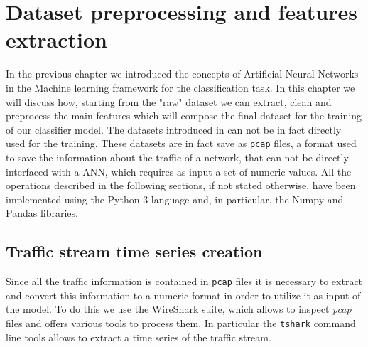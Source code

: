 \chapter{Dataset preprocessing and features extraction}\label{chap4}

In the previous chapter we introduced the concepts of Artificial Neural Networks in the Machine learning framework for the classification task. In this chapter we will discuss how, starting from the "raw" dataset we can extract, clean and preprocess the main features which will compose the final dataset for the training of our classifier model.
The datasets introduced in  can not be in fact directly used for the training. These datasets are in fact save as \texttt{pcap} files, a format used to save the information about the traffic of a network, that can not be directly interfaced with a ANN, which requires as input a set of numeric values. 
All the operations described in the following sections, if not stated otherwise, have been implemented using the Python 3 language\cite{python} and, in particular, the Numpy and Pandas libraries\cite{numpy,pandas}. 

\section{Traffic stream time series creation}

Since all the traffic information is contained in \texttt{pcap} files it is necessary to extract and convert this information to a numeric format in order to utilize it as input of the model.
To do this we use the WireShark suite\cite{wireshark}, which allows to inspect \textit{pcap} files and offers various tools to process them. In particular the \texttt{tshark} command line tools allows to extract a time series of the traffic stream.

